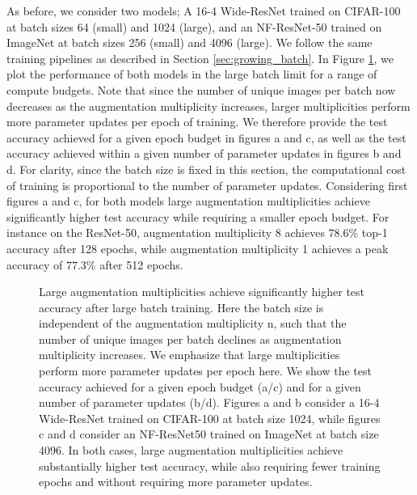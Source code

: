 \documentclass{article}
\begin{document}
As before, we consider two models; A 16-4 Wide-ResNet trained on CIFAR-100 at batch sizes 64 (small) and 1024 (large), and an NF-ResNet-50 \citep{brock2021characterizing} trained on ImageNet at batch sizes 256 (small) and 4096 (large). We follow the same training pipelines as described in Section \ref{sec:growing_batch}.
In Figure \ref{fig:large}, we plot the performance of both models in the large batch limit for a range of compute budgets. Note that since the number of unique images per batch now decreases as the augmentation multiplicity increases, larger multiplicities perform more parameter updates per epoch of training. We therefore provide the test accuracy achieved for a given epoch budget in figures a and c, as well as the test accuracy achieved within a given number of parameter updates in figures b and d. For clarity, since the batch size is fixed in this section, the computational cost of training is proportional to the number of parameter updates. Considering first figures a and c, for both models large augmentation multiplicities achieve significantly higher test accuracy while requiring a smaller epoch budget. For instance on the ResNet-50, augmentation multiplicity 8 achieves $78.6\%$ top-1 accuracy after 128 epochs, while augmentation multiplicity 1 achieves a peak accuracy of $77.3\%$ after 512 epochs. 

\begin{figure}[t]
\centering
 \vskip -1mm
\vskip -2mm
\caption{Large augmentation multiplicities achieve significantly higher test accuracy after large batch training. Here the batch size is independent of the augmentation multiplicity n, such that the number of unique images per batch declines as augmentation multiplicity increases. We emphasize that large multiplicities perform more parameter updates per epoch here. We show the test accuracy achieved for a given epoch budget (a/c) and for a given number of parameter updates (b/d). Figures a and b consider a 16-4 Wide-ResNet trained on CIFAR-100 at batch size 1024, while figures c and d consider an NF-ResNet50 trained on ImageNet at batch size 4096. In both cases, large augmentation multiplicities achieve substantially higher test accuracy, while also requiring fewer training epochs and without requiring more parameter updates.
}
\label{fig:large}
\vskip -2mm
\end{figure}
\end{document}
